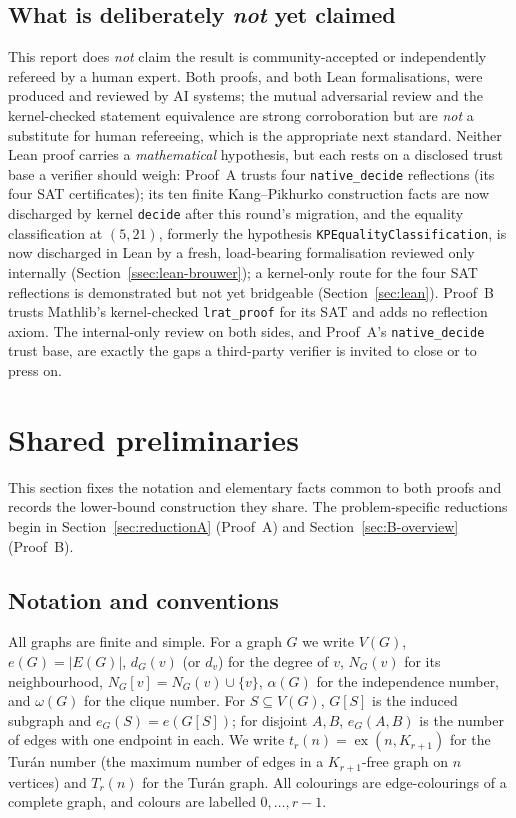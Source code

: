 \documentclass[11pt,reqno]{amsart}
\theoremstyle{definition}
\theoremstyle{remark}
\newcommand{\abs}[1]{\left|#1\right|}
\newcommand{\ex}{\operatorname{ex}}
\begin{document}
\subsection*{What is deliberately \emph{not} yet claimed}
This report does \emph{not} claim the result is community-accepted or independently
refereed by a human expert. Both proofs, and both Lean formalisations, were produced and
reviewed by AI systems; the mutual adversarial review and the kernel-checked statement
equivalence are strong corroboration but are \emph{not} a substitute for human
refereeing, which is the appropriate next standard. Neither Lean proof carries a
\emph{mathematical} hypothesis, but each rests on a disclosed trust base a verifier
should weigh: Proof~A trusts four \texttt{native\_decide} reflections (its four SAT
certificates); its ten finite Kang--Pikhurko construction facts are now discharged by
kernel \texttt{decide} after this round's migration, and the equality classification at
$(5,21)$, formerly the hypothesis \texttt{KPEqualityClassification}, is now discharged in
Lean by a fresh, load-bearing formalisation reviewed only internally
(Section~\ref{ssec:lean-brouwer}); a kernel-only route for the four SAT reflections is
demonstrated but not yet bridgeable (Section~\ref{sec:lean}). Proof~B trusts Mathlib's
kernel-checked \texttt{lrat\_proof} for its
SAT and adds no reflection axiom. The internal-only review on both sides, and Proof~A's
\texttt{native\_decide} trust base, are exactly the gaps a third-party verifier is
invited to close or to press on.

\section{Shared preliminaries}\label{sec:prelim}
This section fixes the notation and elementary facts common to both proofs and records
the lower-bound construction they share. The problem-specific reductions begin in
Section~\ref{sec:reductionA} (Proof~A) and Section~\ref{sec:B-overview} (Proof~B).

\subsection{Notation and conventions}
All graphs are finite and simple. For a graph $G$ we write $V(G)$, $e(G)=\abs{E(G)}$,
$d_G(v)$ (or $d_v$) for the degree of $v$, $N_G(v)$ for its neighbourhood,
$N_G[v]=N_G(v)\cup\{v\}$, $\alpha(G)$ for the independence number, and $\omega(G)$
for the clique number. For $S\subseteq V(G)$, $G[S]$ is the induced subgraph and
$e_G(S)=e(G[S])$; for disjoint $A,B$, $e_G(A,B)$ is the number of edges with one
endpoint in each. We write $t_r(n)=\ex(n,K_{r+1})$ for the Tur\'an number (the
maximum number of edges in a $K_{r+1}$-free graph on $n$ vertices) and $T_r(n)$ for
the Tur\'an graph. All colourings are edge-colourings of a complete graph, and
colours are labelled $0,\dots,r-1$.
\end{document}
